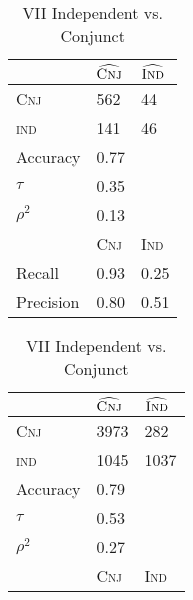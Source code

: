 \begin{table}[H]
  \begin{floatrow}[2]
    \makegapedcells
    \ttabbox%
    {                \begin{tabular}{lll}
                \toprule
                     & $\widehat{\textsc{Cnj}}$ & $\widehat{\textsc{Ind}}$ \\
                \midrule
\textsc{Cnj}    & 562                & 44                    \\
\textsc{ind}    & 141                & 46                    \\
                     \midrule
                     \midrule
Accuracy          & 0.77               &                       \\
$\tau$            & 0.35               &                       \\
$\rho^{2}$        & 0.13               &                       \\
                     \midrule
                     \midrule
                     & \textsc{Cnj}           & \textsc{Ind}           \\
Recall               & 0.93               & 0.25                  \\
Precision            & 0.80               & 0.51 \\
                \bottomrule
                \end{tabular}}
    {\caption{VII Independent vs. Conjunct}
      \label{viiivcms}}
    \hfill%
    \ttabbox%
    {                \begin{tabular}{lll}
                \toprule
                     & $\widehat{\textsc{Cnj}}$ & $\widehat{\textsc{Ind}}$ \\
                \midrule
\textsc{Cnj}    & 3973                & 282                    \\
\textsc{ind}    & 1045                & 1037                    \\
                     \midrule
                     \midrule
Accuracy             & 0.79               &                       \\
$\tau$               & 0.53               &                       \\
$\rho^{2}$           & 0.27               &                       \\
                     \midrule
                     \midrule
                     & \textsc{Cnj}       & \textsc{Ind}           \\

\end{tabular}}
\end{floatrow}
\end{table}
